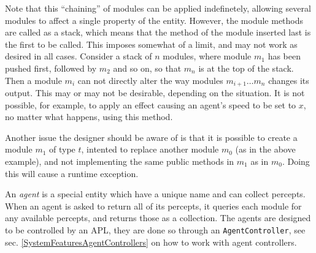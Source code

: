 Note that this ``chaining'' of modules can be applied indefinetely,
allowing several modules to affect a single property of the entity.
However, the module methods are called as a stack, which means that
the method of the module inserted last is the first to be called.
This imposes somewhat of a limit, and may not work as desired in all
cases. Consider a stack of $n$ modules, where module $m_{1}$ has
been pushed first, followed by $m_{2}$ and so on, so that $m_{n}$
is at the top of the stack. Then a module $m_{i}$ can not directly
alter the way modules $m_{i+1}\dots m_{n}$ changes its output. This
may or may not be desirable, depending on the situation. It is not
possible, for example, to apply an effect causing an agent's speed
to be set to $x$, no matter what happens, using this method.

Another issue the designer should be aware of is that it is possible
to create a module $m_{1}$ of type $t$, intented to replace another
module $m_{0}$ (as in the above example), and not implementing the
same public methods in $m_{1}$ as in $m_{0}$. Doing this will cause
a runtime exception.

An \emph{agent} is a special entity which have a unique name and can
collect percepts. When an agent is asked to return all of its percepts,
it queries each module for any available percepts, and returns those
as a collection. The agents are designed to be controlled by an APL,
they are done so through an \texttt{AgentController}, see sec. \ref{SystemFeaturesAgentControllers}
on how to work with agent controllers. 

